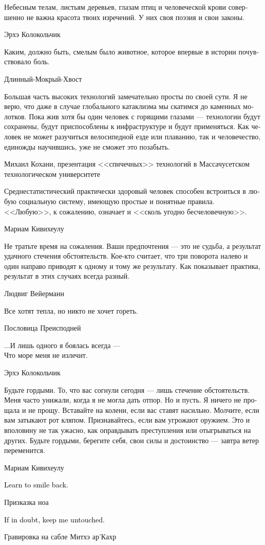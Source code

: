 \documentclass[a4paper,12pt,fleqn]{book}\usepackage{cooltooltips}\usepackage{polyglossia}\setdefaultlanguage[babelshorthands=true]{russian}\setotherlanguage{english}\defaultfontfeatures{Ligatures=TeX,Mapping=tex-text} \usepackage{xcolor}\definecolor{lightgray}{HTML}{bbbbbb}\color{lightgray}\newcommand{\ml}[3]{\textenglish{\textcolor{black}{#3}}}
\begin{document}
{\epigraph
{Небесным телам, листьям деревьев, глазам птиц и человеческой крови совершенно не важна красота твоих изречений.
У них своя поэзия и свои законы.}
{Эрхэ Колокольчик}

\epigraph
{Каким, должно быть, смелым было животное, которое впервые в истории почувствовало боль.}
{Длинный-Мокрый-Хвост}

\epigraph
{Большая часть высоких технологий замечательно просты по своей сути.
Я не верю, что даже в случае глобального катаклизма мы скатимся до каменных молотков.
Пока жив хотя бы один человек с горящими глазами --- технологии будут сохранены, будут приспособлены к инфраструктуре и будут применяться.
Как человек не может разучиться велосипедной езде или плаванию, так и человечество, единожды научившись, уже не сможет это позабыть.}
{Михаил Кохани, презентация <<спичечных>> технологий в Массачусетском технологическом университете}

\epigraph
{Среднестатистический практически здоровый человек способен встроиться в любую социальную систему, имеющую простые и понятные правила.
<<Любую>>, к сожалению, означает и <<сколь угодно бесчеловечную>>.}
{Мариам Кивихеулу}

\epigraph
{Не тратьте время на сожаления.
Ваши предпочтения --- это не судьба, а результат удачного стечения обстоятельств.
Кое-кто считает, что три поворота налево и один направо приводят к одному и тому же результату.
Как показывает практика, результат в этих случаях всегда разный.}
{Людвиг Вейерманн}

\epigraph
{Все хотят тепла, но никто не хочет гореть.}
{Пословица Преисподней}

\epigraph
{...И лишь одного я боялась всегда ---\\
Что море меня не излечит.}
{Эрхэ Колокольчик}

\epigraph
{Будьте гордыми.
То, что вас согнули сегодня --- лишь стечение обстоятельств.
Меня часто унижали, когда я не могла дать отпор.
Но и пусть.
Я ничего не прощала и не прощу.
Вставайте на колени, если вас ставят насильно.
Молчите, если вам затыкают рот кляпом.
Признавайтесь, если вам угрожают оружием.
Это и вполовину не так ужасно, как оправдывать преступления или отыгрываться на других.
Будьте гордыми, берегите себя, свои силы и достоинство --- завтра ветер переменится.}
{Мариам Кивихеулу}

\epigraph{
\ml{$0$}
{Научись улыбаться в ответ.}
{Learn to smile back.}
}{Призказка ноа}

\epigraph
{\ml{$0$}
{Сомневаешься --- оставь меня в ножнах.}
{If in doubt, keep me untouched.}}
{Гравировка на сабле Митхэ ар'Кахр}

}
\end{document}
